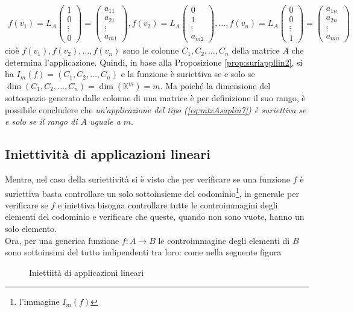 \begin{eqnarray*}
  f(v_1)=L_A
  \begin{pmatrix}
    1\\
    0\\
    \vdots\\
    0
  \end{pmatrix}=
  \begin{pmatrix}
    a_{11}\\
    a_{21}\\
    \vdots\\
    a_{m1}
  \end{pmatrix},f(v_2)=L_A
  \begin{pmatrix}
    0\\
    1\\
    \vdots\\
    a_{m2}
  \end{pmatrix},\dots,f(v_n)=L_A
  \begin{pmatrix}
    0\\
    0\\
    \vdots\\
    1
  \end{pmatrix}=
  \begin{pmatrix}
    a_{1n}\\
    a_{2n}\\
    \vdots\\
    a_{mn}
  \end{pmatrix}
\end{eqnarray*}
cioè $f(v_1),f(v_2),\dots,f(v_n)$ sono le colonne $C_1,C_2,\dots,C_n$
della matrice $A$ che determina l'applicazione. Quindi, in base alla
Proposizione \ref{prop:suriappllin2}, si ha $I_m(f)=(C_1,C_2,\dots,C_n)$
e la funzione è suriettiva se e solo se $\dim(C_1,C_2,\dots,C_n)=
\dim(\mathds{K}^m)=m$. Ma poiché la dimensione del sottospazio generato
dalle colonne di una matrice è per definizione il suo rango, è possibile
concludere che \textit{un'applicazione del tipo (\ref{eq:mtxAsaplin7})
  è suriettiva se e solo se il rango di $A$ uguale a $m$}.

\subsection{Iniettività di applicazioni lineari}
\label{sec:iniediappllin}

Mentre, nel caso della suriettività si è visto che per verificare se una
funzione $f$ è suriettiva basta controllare un solo sottoinsieme del
codominio\footnote{l'immagine $I_m(f)$}, in generale per verificare se
$f$ e iniettiva bisogna controllare tutte le controimmagini degli
elementi del codominio e verificare che queste, quando non sono vuote,
hanno un solo elemento.\\
Ora, per una generica funzione $f:A\to B$ le controimmagine degli
elementi di $B$ sono sottoinsimi del tutto indipendenti tra loro: come
nella seguente figura
\begin{figure}[ht!]
  \centering
  \resizebox{8cm}{!}{}
  \caption{Iniettiità di applicazioni lineari}
  \label{fig:iniediappllin}
\end{figure}

